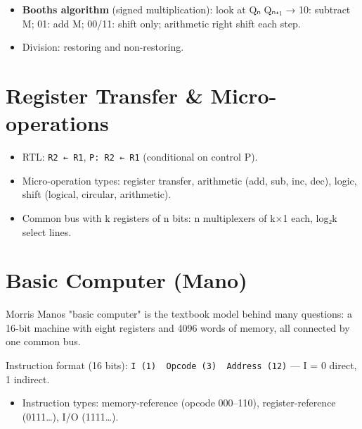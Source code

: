 \begin{itemize}
\tightlist
\item
  \textbf{Booth\textquotesingle s algorithm} (signed multiplication): look at Qₙ Qₙ₊₁ → 10: subtract M; 01: add M; 00/11: shift only; arithmetic right shift each step.
\item
  Division: restoring and non-restoring.
\end{itemize}

\needspace{95pt}

\hypertarget{p2-02--3-register-transfer--micro-operations}{%
\section{Register Transfer \& Micro-operations}\label{p2-02--3-register-transfer--micro-operations}}

\begin{itemize}
\tightlist
\item
  RTL: \texttt{R2\ ←\ R1}, \texttt{P:\ R2\ ←\ R1} (conditional on control P).
\item
  Micro-operation types: register transfer, arithmetic (add, sub, inc, dec), logic, shift (logical, circular, arithmetic).
\item
  Common bus with k registers of n bits: n multiplexers of k×1 each, log₂k select lines.
\end{itemize}

\needspace{125pt}

\hypertarget{p2-02--4-basic-computer-mano}{%
\section{Basic Computer (Mano)}\label{p2-02--4-basic-computer-mano}}

Morris Mano\textquotesingle s "basic computer" is the textbook model behind many questions: a 16-bit machine with eight
registers and 4096 words of memory, all connected by one common bus.



Instruction format (16 bits): \texttt{I\ (1)\ \textbar{}\ Opcode\ (3)\ \textbar{}\ Address\ (12)} --- I = 0 direct, 1 indirect.

\begin{itemize}
\tightlist
\item
  Instruction types: memory-reference (opcode 000--110), register-reference (0111\ldots), I/O (1111\ldots).
\end{itemize}

